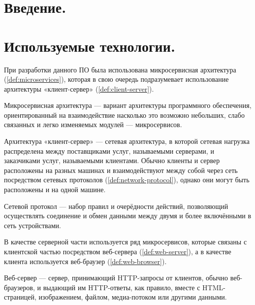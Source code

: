 \section{Введение.}

\clearpage

\section{Используемые технологии.}

При разработки данного ПО была использована микросервисная архитектура (\ref{def:microservices}), которая в свою очередь
подразумевает использование архитектуры «клиент-сервер» (\ref{def:client-server}).

\begin{definition}
    \label{def:microservices}
    Микросервисная архитектура — вариант архитектуры программного обеспечения,
    ориентированный на взаимодействие насколько это возможно небольших, слабо связанных и легко изменяемых
    модулей — микросервисов.
\end{definition}

\begin{definition}
    \label{def:client-server}
    Архитектура «клиент-сервер» — сетевая архитектура, в которой сетевая нагрузка распределена между поставщиками услуг,
    называемыми серверами, и заказчиками услуг, называемыми клиентами. Обычно клиенты и сервер расположены на разных
    машинах и взаимодействуют между собой через сеть посредством сетевых протоколов (\ref{def:network-protocol}),
    однако они могут быть расположены и на одной машине.
\end{definition}

\begin{definition}
    \label{def:network-protocol}
    Сетевой протокол — набор правил и очерёдности действий, позволяющий осуществлять соединение и
    обмен данными между двумя и более включёнными в сеть устройствами.
\end{definition}

\noindent В качестве серверной части используется ряд микросервисов, которые связаны с клиентской частью посредством
веб-сервера (\ref{def:web-server}), а в качестве клиента используется веб-браузер (\ref{def:web-browser}).

\begin{definition}
    \label{def:web-server}
    Веб-сервер — сервер, принимающий HTTP-запросы от клиентов, обычно веб-браузеров, и выдающий им HTTP-ответы,
    как правило, вместе с HTML-страницей, изображением, файлом, медиа-потоком или другими данными.
\end{definition}

